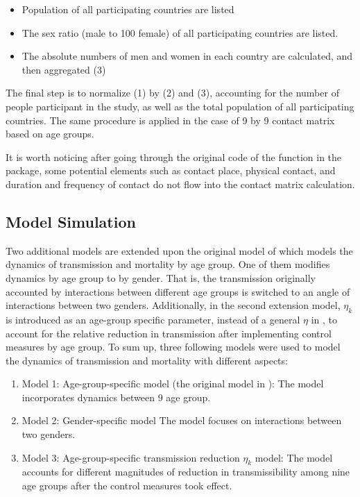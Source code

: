 \documentclass[../main.tex]{subfiles}
\begin{document}
\begin{itemize}
    \item Population of all participating countries are listed
    \item The sex ratio (male to 100 female) of all participating countries are listed.
    \item The absolute numbers of men and women in each country are calculated, and then aggregated (3)
\end{itemize}

The final step is to normalize (1) by (2) and (3), accounting for the number of people participant in the study, as well as the total population of all participating countries. The same procedure is applied in the case of 9 by 9 contact matrix based on age groups.

It is worth noticing after going through the original code of the function in the package, some potential elements such as contact place, physical contact, and duration and frequency of contact do not flow into the contact matrix calculation.
\subsection{Model Simulation}
\label{sec: ModelSimulation}

Two additional models are extended upon the original model of \cite{The original work} which models the dynamics of transmission and mortality by age group. One of them modifies dynamics by age group to by gender. That is, the transmission originally accounted by interactions between different age groups is switched to an angle of interactions between two genders. Additionally, in the second extension model,  $\eta_k$  is introduced as an age-group specific parameter, instead of a general $\eta$ in \cite{The original work}, to account for the relative reduction in transmission after implementing control measures by age group. To sum up, three following models were used to model the dynamics of transmission and mortality with different aspects: 

\begin{enumerate} 
\item Model 1: Age-group-specific model (the original model in \cite{The original work}): 
\label{Model_1}
\newline The model incorporates dynamics between 9 age group.  
\item Model 2: Gender-specific model
\label{Model_2}
\newline The model focuses on interactions between two genders. 
\item Model 3: Age-group-specific transmission reduction $\eta_k$ model: 
\label{Model_3}
\newline The model accounts for different magnitudes of reduction in transmissibility among nine age groups after the control measures took effect. 
\end{enumerate}
\end{document}
